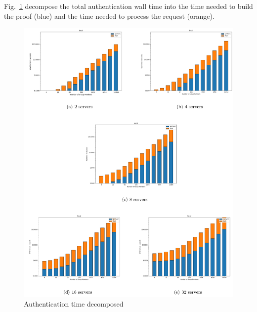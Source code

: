     Fig.~\ref{fig:stackedauthtime}  %
    decompose the total authentication wall time into the time needed to build the proof (blue) and
    the time needed to process the request (orange).\vspace*{0.3cm}
    \begin{figure}
        \centering
        \includegraphics[width=0.8\linewidth]{images/plots/stackedHack.png}
        \vspace*{1cm}
        \caption{Authentication time decomposed}
        \label{fig:stackedauthtime}
    \end{figure}

